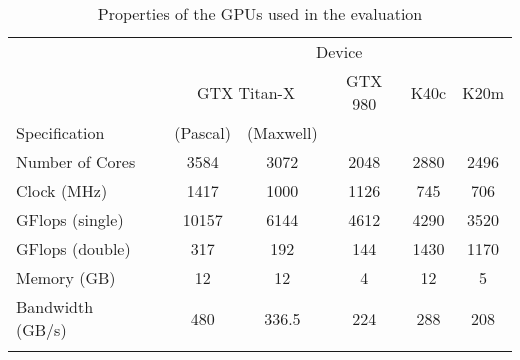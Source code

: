 \begin{table}[tb]	%
%
%
%
\setlength\tabcolsep{0.4em}
\center\begin{tabular}{lc c c c c c}
                         && \multicolumn{5}{c}{Device} \\
\cline{3-7}
                && \multicolumn{2}{c}{GTX Titan-X} & GTX 980 & K40c  & K20m  \\
Specification            && (Pascal) & (Maxwell)   &         &       &       \\
\cline{1-1}\cline{3-7}
Number of Cores          && 3584     & 3072        & 2048    & 2880  & 2496  \\
Clock (MHz)              && 1417     & 1000        & 1126    & 745   & 706   \\
GFlops (single)          && 10157    & 6144        & 4612    & 4290  & 3520  \\
GFlops (double)          && 317      & 192         & 144     & 1430  & 1170  \\
Memory (GB)              && 12       & 12          & 4       & 12    & 5     \\
Bandwidth (GB/s)         && 480      & 336.5       & 224     & 288   & 208   \\
\cline{1-1}\cline{3-7}
\\[-1.5ex]
\end{tabular}
\caption{Properties of the GPUs used in the evaluation}
\label{table-gpus}
\end{table}

